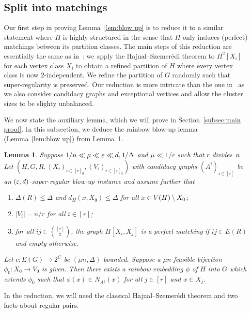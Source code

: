 \documentclass[10pt]{amsart}
\newtheorem{lemma}[algorithm]{Lemma}
\theoremstyle{definition}
\theoremstyle{claimstyle}
\theoremstyle{stepstyle}
\numberwithin{equation}{section}
\begin{document}
\subsection{Split into matchings} \label{subsec:matching split}

Our first step in proving Lemma~\ref{lem:blow up} is to reduce it to a similar statement where $H$ is highly structured in the sense that $H$ only induces (perfect) matchings between its partition classes. The main steps of this reduction are essentially the same as in~\cite{RR:99}: we apply the Hajnal--Szemer\'edi theorem to $H^2[X_i]$ for each vertex class $X_i$ to obtain a refined partition of $H$ where every vertex class is now $2$-independent. We refine the partition of $G$ randomly such that super-regularity is preserved. Our reduction is more intricate than the one in~\cite{RR:99} as we also consider candidacy graphs and exceptional vertices and allow the cluster sizes to be slighty unbalanced.

We now state the auxiliary lemma, which we will prove in Section~\ref{subsec:main proof}.
In this subsection, we deduce the rainbow blow-up lemma (Lemma~\ref{lem:blow up}) from Lemma~\ref{lem:blow up matchings}.


\begin{lemma} \label{lem:blow up matchings}
Suppose $1/n \ll \mu \ll {\varepsilon} \ll d,1/\Delta$ and $\mu \ll 1/r$ such that $r$ divides~$n$.
Let $(H,G,R,(X_i)_{i\in[r]_0},(V_i)_{i\in[r]_0})$ with candidacy graphs $(A^i)_{i\in[r]}$ be an $({\varepsilon},d)$-super-regular blow-up instance and assume further that
\begin{enumerate}[label={\rm (\roman*)}]
	\item $\Delta(R)\le \Delta$ and $d_H(x,X_0)\leq \Delta$ for all $x\in V(H)\setminus X_0$;
	\item $|V_i|=n/r$ for all $i\in[r]$;
	\item for all $ij\in \binom{[r]}{2}$, the graph $H[X_i,X_j]$ is a perfect matching if $ij\in E(R)$ and empty otherwise.
\end{enumerate}
Let $c\colon E(G)\to 2^C$ be $(\mu n,\Delta)$-bounded.
Suppose a $\mu n$-feasible bijection $\phi_0 \colon X_0 \to V_0$ is given.
Then there exists a rainbow embedding $\phi$ of $H$ into $G$ which extends $\phi_0$
such that $\phi(x)\in N_{A^j}(x)$ for all $j\in [r]$ and $x\in X_j$.
\end{lemma}


In the reduction, we will need the classical Hajnal--Szemer\'edi theorem and two facts about regular pairs.
\end{document}
